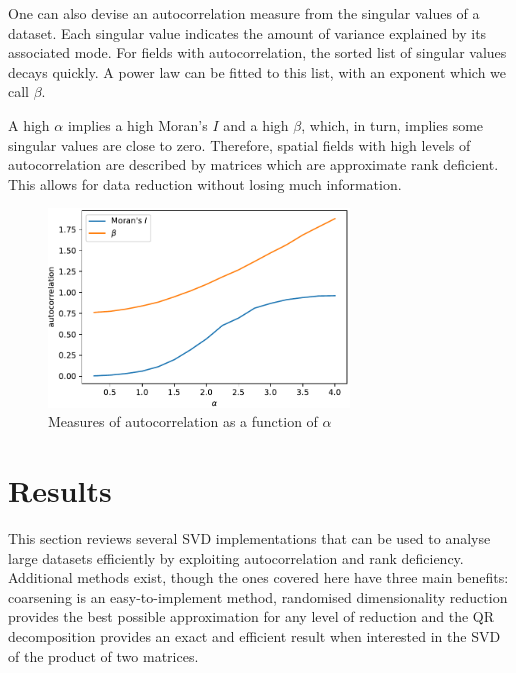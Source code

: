 \documentclass[ijgi,article,submit,moreauthors,pdftex,10pt,a4paper]{Definitions/mdpi}
\begin{document}
One can also devise an autocorrelation measure from the singular values of a dataset. Each singular value indicates the amount of variance explained by its associated mode. For fields with autocorrelation, the sorted list of singular values decays quickly. A power law can be fitted to this list, with an exponent which we call $\beta$.

A high $\alpha$ implies a high Moran's $I$ and a high $\beta$, which, in turn, implies some singular values are close to zero. Therefore, spatial fields with high levels of autocorrelation are described by matrices which are approximate rank deficient. This allows for data reduction without losing much information.

\begin{figure}[H]
\centering
\includegraphics[width=80mm]{Results/plotMoransIAndBeta.pdf}
\caption[Various measures of autocorrelation]{Measures of autocorrelation as a function of $\alpha$}
\label{fig:plotMoransIAndBeta}
\end{figure}

\section{Results} %

This section reviews several SVD implementations that can be used to analyse large datasets efficiently by exploiting autocorrelation and rank deficiency. Additional methods exist, though the ones covered here have three main benefits: coarsening is an easy-to-implement method, randomised dimensionality reduction provides the best possible approximation for any level of reduction and the QR decomposition provides an exact and efficient result when interested in the SVD of the product of two matrices.

\end{document}
